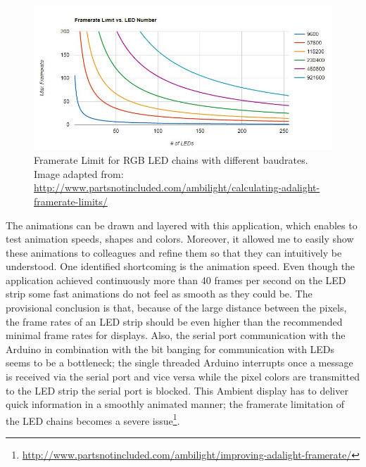 \begin{figure}
    \includegraphics[width=\textwidth]{fig/FPS.JPG}
    \caption[Framerate Limit of RGB LEDs]{Framerate Limit for RGB LED chains with different baudrates. Image adapted from: \url{http://www.partsnotincluded.com/ambilight/calculating-adalight-framerate-limits/}}
    \label{fig:FPS}
\end{figure}

The animations can be drawn and layered with this application, which enables to test  animation speeds, shapes and colors. Moreover, it allowed me to easily show these animations to colleagues and refine them so that they can intuitively be understood. One identified shortcoming is the animation speed. Even though the application achieved continuously more than 40 frames per second on the LED strip some fast animations do not feel as smooth as they could be. The provisional conclusion is that, because of the large distance between the pixels, the frame rates of an LED strip should be even higher than the recommended minimal frame rates for displays. Also, the serial port communication with the Arduino in combination with the bit banging for communication with LEDs seems to be a bottleneck; the single threaded Arduino interrupts once a message is received via the serial port and vice versa while the pixel colors are transmitted to the LED strip the serial port is blocked. This Ambient display has to deliver quick information in a smoothly animated manner; the framerate limitation of the LED chains becomes a severe issue\footnote{\url{http://www.partsnotincluded.com/ambilight/improving-adalight-framerate/}}. 

